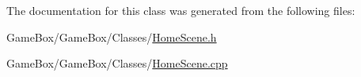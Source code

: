 \-The documentation for this class was generated from the following files\-:\begin{DoxyCompactItemize}
\item 
\-Game\-Box/\-Game\-Box/\-Classes/\hyperlink{_home_scene_8h}{\-Home\-Scene.\-h}\item 
\-Game\-Box/\-Game\-Box/\-Classes/\hyperlink{_home_scene_8cpp}{\-Home\-Scene.\-cpp}\end{DoxyCompactItemize}
